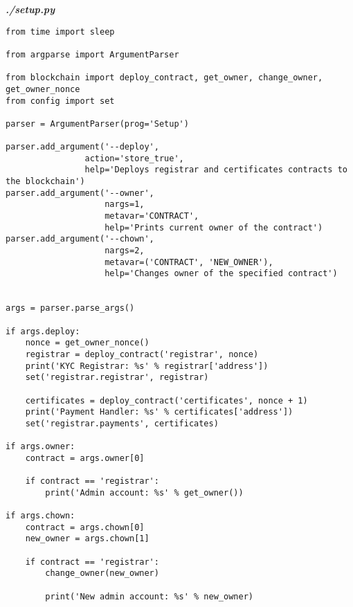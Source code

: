 \textit{\textbf{./setup.py}}
\begin{verbatim}
from time import sleep

from argparse import ArgumentParser

from blockchain import deploy_contract, get_owner, change_owner, get_owner_nonce
from config import set

parser = ArgumentParser(prog='Setup')

parser.add_argument('--deploy',
                action='store_true',
                help='Deploys registrar and certificates contracts to the blockchain')
parser.add_argument('--owner',
                    nargs=1,
                    metavar='CONTRACT',
                    help='Prints current owner of the contract')
parser.add_argument('--chown',
                    nargs=2,
                    metavar=('CONTRACT', 'NEW_OWNER'),
                    help='Changes owner of the specified contract')


args = parser.parse_args()

if args.deploy:
    nonce = get_owner_nonce()
    registrar = deploy_contract('registrar', nonce)
    print('KYC Registrar: %s' % registrar['address'])
    set('registrar.registrar', registrar)

    certificates = deploy_contract('certificates', nonce + 1)
    print('Payment Handler: %s' % certificates['address'])
    set('registrar.payments', certificates)

if args.owner:
    contract = args.owner[0]

    if contract == 'registrar':
        print('Admin account: %s' % get_owner())

if args.chown:
    contract = args.chown[0]
    new_owner = args.chown[1]

    if contract == 'registrar':
        change_owner(new_owner)

        print('New admin account: %s' % new_owner)
\end{verbatim}


